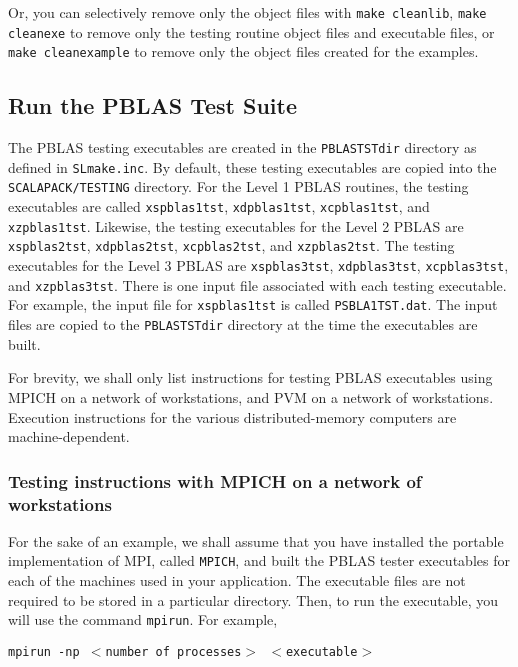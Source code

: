\documentclass[11pt]{report}
\begin{document}
Or, you can selectively remove only the object files with {\tt make
cleanlib}, {\tt make cleanexe}  to remove only the testing routine
object files and executable files, or {\tt make cleanexample} to remove 
only the object files created for the examples.

\subsection{Run the PBLAS Test Suite}
\label{PBTEST}

The PBLAS testing executables are created in the {\tt PBLASTSTdir}
directory as defined in {\tt SLmake.inc}.  By default, these testing
executables are copied into the {\tt SCALAPACK/TESTING} directory.
 For the Level 1 PBLAS routines, the testing executables are called
{\tt xspblas1tst}, {\tt xdpblas1tst}, {\tt xcpblas1tst}, and {\tt xzpblas1tst}.
Likewise, the testing executables for the Level 2 PBLAS are {\tt xspblas2tst},
{\tt xdpblas2tst}, {\tt xcpblas2tst}, and {\tt xzpblas2tst}.  The
testing executables for the Level 3 PBLAS are {\tt xspblas3tst},
{\tt xdpblas3tst}, {\tt xcpblas3tst}, and {\tt xzpblas3tst}. There is one input
file associated with each testing executable.  For example, the input
file for {\tt xspblas1tst} is called {\tt PSBLA1TST.dat}.  The input files
are copied to the {\tt PBLASTSTdir} directory at the time the
executables are built.

For brevity, we shall only list instructions for testing PBLAS
executables using MPICH on a network of workstations, and PVM on
a network of workstations.  Execution instructions for the various
distributed-memory computers are machine-dependent.

\subsubsection*{Testing instructions with MPICH on a network of workstations}

For the sake of an example, we shall assume that you have installed the
portable implementation of MPI, called {\tt MPICH}, and built the
PBLAS tester executables for each of the machines used in your 
application.  The executable files are not required to be stored in
a particular directory.  Then, to run the executable, you will use
the command {\tt mpirun}.  For example,
 
\begin{list}{}{}
\item{\tt mpirun -np $<$number of processes$>$~$<$executable$>$}
\end{list}
 
\end{document}
